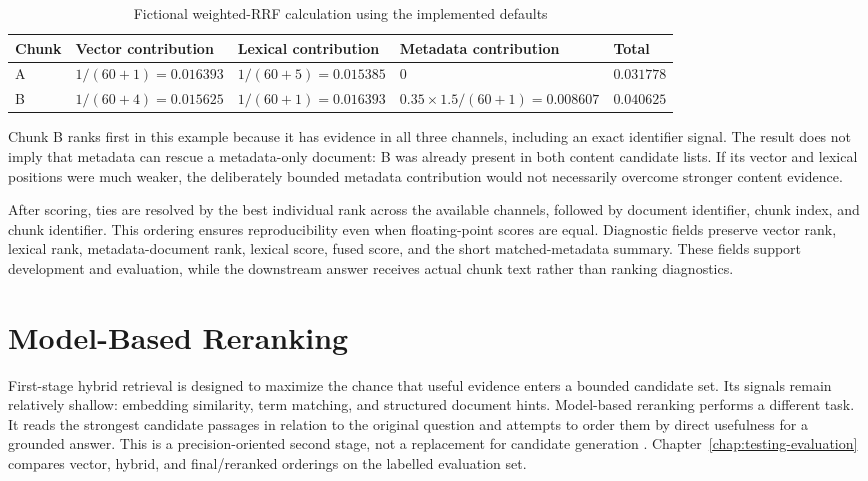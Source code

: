 \begin{table}[!htbp]
	\centering
	\caption{Fictional weighted-RRF calculation using the implemented defaults}
	\label{tab:rrf-worked-example}
	\small
	\begin{tabular}{@{}p{1.1cm}p{3.0cm}p{3.0cm}p{3.6cm}p{2.6cm}@{}}
		\toprule
		Chunk & Vector contribution & Lexical contribution & Metadata contribution & Total \\
		\midrule
		A & $1/(60+1)=0.016393$ & $1/(60+5)=0.015385$ & $0$ & $0.031778$ \\
		B & $1/(60+4)=0.015625$ & $1/(60+1)=0.016393$ & $0.35\times1.5/(60+1)=0.008607$ & $0.040625$ \\
		\bottomrule
	\end{tabular}
\end{table}

Chunk B ranks first in this example because it has evidence in all three channels, including an exact identifier signal. The result does not imply that metadata can rescue a metadata-only document: B was already present in both content candidate lists. If its vector and lexical positions were much weaker, the deliberately bounded metadata contribution would not necessarily overcome stronger content evidence.

After scoring, ties are resolved by the best individual rank across the available channels, followed by document identifier, chunk index, and chunk identifier. This ordering ensures reproducibility even when floating-point scores are equal. Diagnostic fields preserve vector rank, lexical rank, metadata-document rank, lexical score, fused score, and the short matched-metadata summary. These fields support development and evaluation, while the downstream answer receives actual chunk text rather than ranking diagnostics.

\section{Model-Based Reranking}
\label{sec:model-reranking}
\leavevmode\par

First-stage hybrid retrieval is designed to maximize the chance that useful evidence enters a bounded candidate set. Its signals remain relatively shallow: embedding similarity, term matching, and structured document hints. Model-based reranking performs a different task. It reads the strongest candidate passages in relation to the original question and attempts to order them by direct usefulness for a grounded answer. This is a precision-oriented second stage, not a replacement for candidate generation \cite{Nogueira2019BERT}. Chapter~\ref{chap:testing-evaluation} compares vector, hybrid, and final/reranked orderings on the labelled evaluation set.

